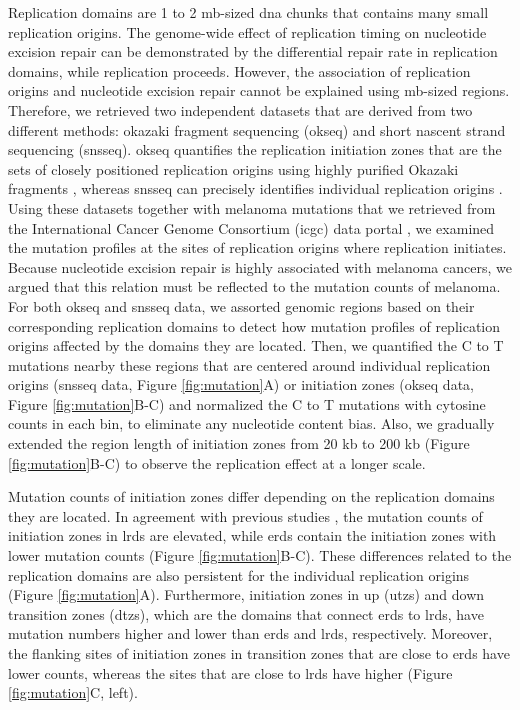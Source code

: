 Replication domains are 1 to 2 \gls{mb}-sized \gls{dna} chunks that contains many small replication origins. The genome-wide effect of replication timing on nucleotide excision repair can be demonstrated by the differential repair rate in replication domains, while replication proceeds. However, the association of replication origins and nucleotide excision repair cannot be explained using \gls{mb}-sized regions. Therefore, we retrieved two independent datasets that are derived from two different methods: okazaki fragment sequencing (\gls{okseq}) and short nascent strand sequencing (\gls{snsseq}). \gls{okseq} quantifies the replication initiation zones that are the sets of closely positioned replication origins using highly purified Okazaki fragments \citep{petryk2016replication}, whereas \gls{snsseq} can precisely identifies individual replication origins \citep{besnard2012unraveling,langley2016genome}. Using these datasets together with melanoma mutations that we retrieved from the International Cancer Genome Consortium (\gls{icgc}) data portal \citep{hayward2017whole}, we examined the mutation profiles at the sites of replication origins where replication initiates. Because nucleotide excision repair is highly associated with melanoma cancers, we argued that this relation must be reflected to the mutation counts of melanoma. For both \gls{okseq} and \gls{snsseq} data, we assorted genomic regions based on their corresponding replication domains to detect how mutation profiles of replication origins affected by the domains they are located. Then, we quantified the \gls{C} to \gls{T} mutations nearby these regions that are centered around individual replication origins (\gls{snsseq} data, Figure \ref{fig:mutation}A) or initiation zones (\gls{okseq} data, Figure \ref{fig:mutation}B-C) and normalized the \gls{C} to \gls{T} mutations with cytosine counts in each bin, to eliminate any nucleotide content bias. Also, we gradually extended the region length of initiation zones from 20 \gls{kb} to 200 \gls{kb} (Figure \ref{fig:mutation}B-C) to observe the replication effect at a longer scale.

Mutation counts of initiation zones differ depending on the replication domains they are located. In agreement with previous studies \citep{lawrence2013mutational,schuster2012chromatin,stamatoyannopoulos2009human}, the mutation counts of initiation zones in \gls{lrd}s are elevated, while \gls{erd}s contain the initiation zones with lower mutation counts (Figure \ref{fig:mutation}B-C). These differences related to the replication domains are also persistent for the individual replication origins (Figure \ref{fig:mutation}A). Furthermore, initiation zones in up (\gls{utz}s) and down transition zones (\gls{dtz}s), which are the domains that connect \gls{erd}s to \gls{lrd}s, have mutation numbers higher and lower than \gls{erd}s and \gls{lrd}s, respectively. Moreover, the flanking sites of initiation zones in transition zones that are close to \gls{erd}s have lower counts, whereas the sites that are close to \gls{lrd}s have higher (Figure \ref{fig:mutation}C, left). 

